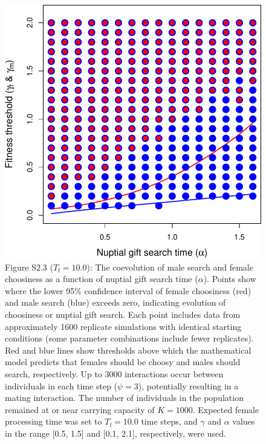 \documentclass[
]{article}
\begin{document}
\captionsetup{labelformat=empty}

\begin{figure}
\centering
\includegraphics{SI_files/figure-latex/unnamed-chunk-4-1.pdf}
\caption{Figure S2.3 (\(T_{\mathrm{f}} = 10.0\)): The coevolution of
male search and female choosiness as a function of nuptial gift search
time (\(\alpha\)). Points show where the lower 95\% confidence interval
of female choosiness (red) and male search (blue) exceeds zero,
indicating evolution of choosiness or nuptial gift search. Each point
includes data from approximately 1600 replicate simulations with
identical starting conditions (some parameter combinations include fewer
replicates). Red and blue lines show thresholds above which the
mathematical model predicts that females should be choosy and males
should search, respectively. Up to 3000 interactions occur between
individuals in each time step (\(\psi = 3\)), potentially resulting in a
mating interaction. The number of individuals in the population remained
at or near carrying capacity of \(K = 1000\). Expected female processing
time was set to \(T_{\mathrm{f}}=10.0\) time steps, and \(\gamma\) and
\(\alpha\) values in the range {[}0.5, 1.5{]} and {[}0.1, 2.1{]},
respectively, were used.}
\end{figure}

\captionsetup{labelformat=default}
\end{document}
